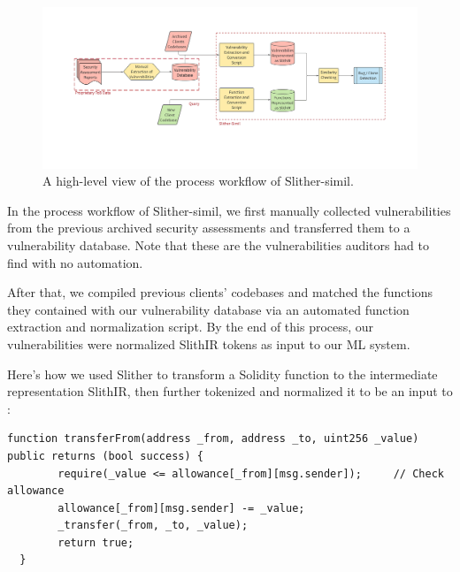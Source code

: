 \begin{figure}
  \centering
  \includegraphics[width=\textwidth]{figures/slitherS.png}
  \caption{A high-level view of the process workflow of Slither-simil.}
  \label{fig:slithersimilhighlevel}
\end{figure}

In the process workflow of Slither-simil, we first manually collected vulnerabilities from the previous archived security assessments and transferred them to a vulnerability database.
Note that these are the vulnerabilities auditors had to find with no automation.

After that, we compiled previous clients' codebases and matched the functions they contained with our vulnerability database via an automated function extraction and normalization script.
By the end of this process, our vulnerabilities were normalized SlithIR tokens as input to our ML system.

Here's how we used Slither to transform a Solidity function to the intermediate representation SlithIR, then further tokenized and normalized it to be an input to \slithersimil:

\begin{lstlisting}[float,caption= complete Solidity function from the contract TurtleToken.sol., escapechar=\%, language=Solidity, label=lst:solidity-bug]
  function transferFrom(address _from, address _to, uint256 _value) public returns (bool success) {
        require(_value <= allowance[_from][msg.sender]);     // Check allowance
        allowance[_from][msg.sender] -= _value;
        _transfer(_from, _to, _value);
        return true;
  }
  \end{lstlisting}

